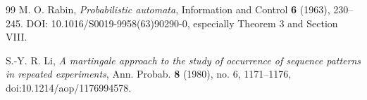 \begin{thebibliography}{99}
 M. O. Rabin, \emph{Probabilistic automata},
Information and Control \textbf{6} (1963), 230--245.
DOI: 10.1016/S0019-9958(63)90290-0, especially Theorem 3 and Section VIII.

S.-Y. R. Li, \emph{A martingale approach to the study of occurrence of
sequence patterns in repeated experiments}, Ann. Probab. \textbf{8}
(1980), no. 6, 1171--1176, doi:10.1214/aop/1176994578.

\end{thebibliography}
